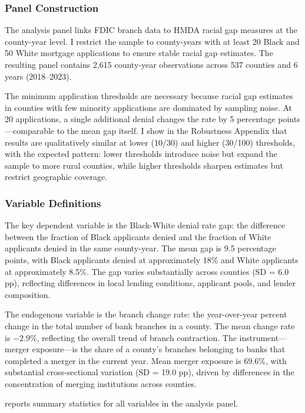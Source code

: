 \documentclass[12pt]{article}
\begin{document}
\subsubsection*{Panel Construction} The analysis panel links FDIC branch data to HMDA racial gap measures at the county-year level. I restrict the sample to county-years with at least 20 Black and 50 White mortgage applications to ensure stable racial gap estimates. The resulting panel contains 2,615 county-year observations across 537 counties and 6 years (2018--2023).

The minimum application thresholds are necessary because racial gap estimates in counties with few minority applications are dominated by sampling noise. At 20 applications, a single additional denial changes the rate by 5 percentage points---comparable to the mean gap itself. I show in the Robustness Appendix that results are qualitatively similar at lower (10/30) and higher (30/100) thresholds, with the expected pattern: lower thresholds introduce noise but expand the sample to more rural counties, while higher thresholds sharpen estimates but restrict geographic coverage.

\subsubsection*{Variable Definitions} The key dependent variable is the Black-White denial rate gap: the difference between the fraction of Black applicants denied and the fraction of White applicants denied in the same county-year. The mean gap is 9.5 percentage points, with Black applicants denied at approximately 18\% and White applicants at approximately 8.5\%. The gap varies substantially across counties (SD = 6.0 pp), reflecting differences in local lending conditions, applicant pools, and lender composition.

The endogenous variable is the branch change rate: the year-over-year percent change in the total number of bank branches in a county. The mean change rate is $-2.9\%$, reflecting the overall trend of branch contraction. The instrument---merger exposure---is the share of a county's branches belonging to banks that completed a merger in the current year. Mean merger exposure is 69.6\%, with substantial cross-sectional variation (SD = 19.0 pp), driven by differences in the concentration of merging institutions across counties.

 reports summary statistics for all variables in the analysis panel.
\end{document}
